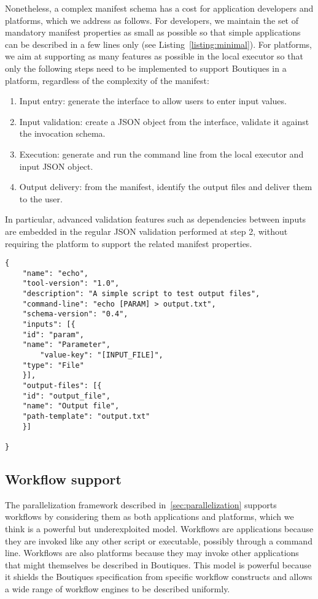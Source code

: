 \documentclass{article}
\newcommand{\boutiques}{Boutiques\xspace}
\begin{document}
Nonetheless, a complex manifest schema has a cost for application
developers and platforms, which we address as follows. For developers,
we maintain the set of mandatory manifest properties as small as
possible so that simple applications can be described in a few lines
only (see Listing~\ref{listing:minimal}). For platforms, we aim at
supporting as many features as possible in the local executor so that
only the following steps need to be implemented to support \boutiques
in a platform, regardless of the complexity of the manifest:
\begin{enumerate}
  \item Input entry: generate the interface to allow users to enter
    input values.
  \item Input validation: create a JSON object from the interface,
    validate it against the invocation schema.
  \item Execution: generate and run the command line from the local
    executor and input JSON object.
  \item Output delivery: from the manifest, identify the output files
    and deliver them to the user.
\end{enumerate}
In particular, advanced validation features such as dependencies
between inputs are embedded in the regular JSON validation performed
at step 2, without requiring the platform to support the related
manifest properties.
\begin{listing}
\begin{verbatim}
{
    "name": "echo",
    "tool-version": "1.0",
    "description": "A simple script to test output files",
    "command-line": "echo [PARAM] > output.txt",
    "schema-version": "0.4",
    "inputs": [{
	"id": "param",
	"name": "Parameter",
        "value-key": "[INPUT_FILE]",
	"type": "File"
    }],
    "output-files": [{
	"id": "output_file",
	"name": "Output file",
	"path-template": "output.txt"
    }]

}
\end{verbatim}
\caption{A minimal \boutiques manifest.} 
\label{listing:minimal}
\end{listing}

\subsection{Workflow support}

The parallelization framework described in~\ref{sec:parallelization}
supports workflows by considering them as both applications and
platforms, which we think is a powerful but underexploited
model. Workflows are applications because they are invoked like any
other script or executable, possibly through a command line. Workflows
are also platforms because they may invoke other applications that
might themselves be described in \boutiques. This model is powerful
because it shields the \boutiques specification from specific workflow
constructs and allows a wide range of workflow engines to be described
uniformly. 
\end{document}

